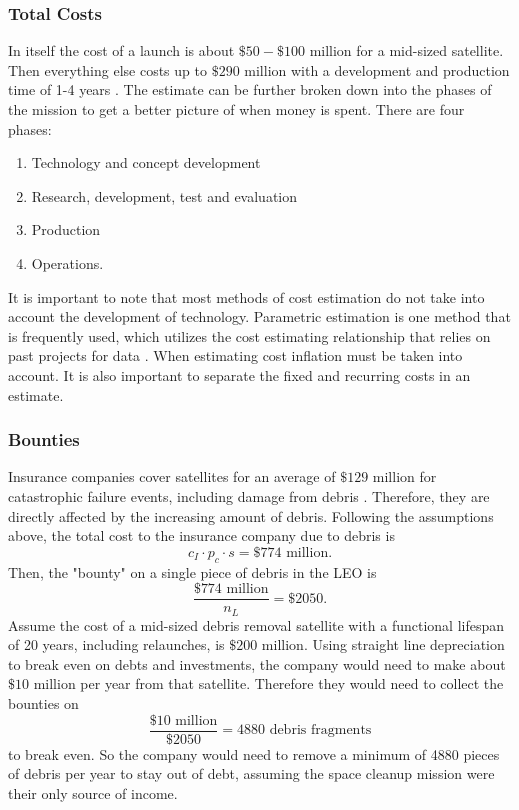 \documentclass[12pt]{scrartcl}
\begin{document}
\subsubsection{Total Costs}
In itself the cost of a launch is about \(\$50-\$100\) million for a mid-sized satellite. Then everything else costs up to \(\$290\) million with a development and production time of 1-4 years \cite{cost}. The estimate can be further broken down into the phases of the mission to get a better picture of when money is spent. There are four phases:
\begin{enumerate}
    \item Technology and concept development
    \item Research, development, test and evaluation
    \item Production
    \item Operations.
\end{enumerate}

It is important to note that most methods of cost estimation do not take into account the development of technology. Parametric estimation is one method that is frequently used, which utilizes the cost estimating relationship that relies on past projects for data \cite{cost}. When estimating cost inflation must be taken into account. It is also important to separate the fixed and recurring costs in an estimate.


\subsubsection{Bounties}
Insurance companies cover satellites for an average of \(\$129\) million for catastrophic failure events, including damage from debris \cite{cost}. Therefore, they are directly affected by the increasing amount of debris. Following the assumptions above, the total cost to the insurance company due to debris is 
\[c_I \cdot p_c \cdot s = \$774\text{ million}.\]
Then, the "bounty" on a single piece of debris in the LEO is
\[\frac{\$774\text{ million}}{n_L}=\$2050.\]
Assume the cost of a mid-sized debris removal satellite with a functional lifespan of 20 years, including relaunches, is \(\$200\) million. Using straight line depreciation to break even on debts and investments, the company would need to make about \(\$10\) million per year from that satellite. Therefore they would need to collect the bounties on 
\[\frac{\$10\text{ million}}{\$2050}=4880\text{ debris fragments}\]
to break even. So the company would need to remove a minimum of 4880 pieces of debris per year to stay out of debt, assuming the space cleanup mission were their only source of income.
\end{document}

